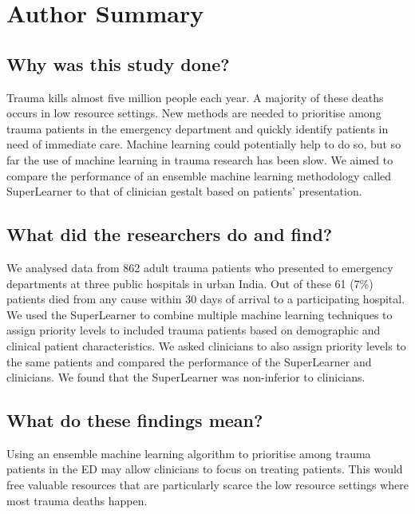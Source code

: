 \documentclass[10pt,letterpaper]{article}\usepackage[]{graphicx}\usepackage[]{color}
\begin{document}
\section*{Author Summary}
\subsection*{Why was this study done?}
Trauma kills almost five million people each year. A majority of these deaths
occurs in low resource settings. New methods are needed to prioritise among
trauma patients in the emergency department and quickly identify patients in
need of immediate care. Machine learning could potentially help to do so, but so
far the use of machine learning in trauma research has been slow. We aimed to
compare the performance of an ensemble machine learning methodology called
SuperLearner to that of clinician gestalt based on patients’ presentation.

\subsection*{What did the researchers do and find?}
We analysed data from 862 adult trauma
patients who presented to emergency departments at three public hospitals in
urban India. Out of these 61 (7\%) patients died from any
cause within 30 days of arrival to a participating hospital. We used the
SuperLearner to combine multiple machine learning techniques to assign priority
levels to included trauma patients based on demographic and clinical patient
characteristics. We asked clinicians to also assign priority levels to the same
patients and compared the performance of the SuperLearner and clinicians. We
found that the SuperLearner was non-inferior to clinicians.

\subsection*{What do these findings mean?}
Using an ensemble machine learning algorithm to prioritise among trauma patients
in the ED may allow clinicians to focus on treating patients. This would free
valuable resources that are particularly scarce the low resource settings where
most trauma deaths happen.

\linenumbers

\end{document}
